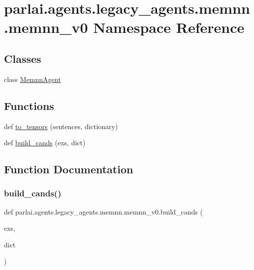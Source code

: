 \hypertarget{namespaceparlai_1_1agents_1_1legacy__agents_1_1memnn_1_1memnn__v0}{}\section{parlai.\+agents.\+legacy\+\_\+agents.\+memnn.\+memnn\+\_\+v0 Namespace Reference}
\label{namespaceparlai_1_1agents_1_1legacy__agents_1_1memnn_1_1memnn__v0}
\subsection*{Classes}
\begin{DoxyCompactItemize}
\item 
class \hyperlink{classparlai_1_1agents_1_1legacy__agents_1_1memnn_1_1memnn__v0_1_1MemnnAgent}{Memnn\+Agent}
\end{DoxyCompactItemize}
\subsection*{Functions}
\begin{DoxyCompactItemize}
\item 
def \hyperlink{namespaceparlai_1_1agents_1_1legacy__agents_1_1memnn_1_1memnn__v0_a8bf19c6993b40602c1d86a848b30c5a1}{to\+\_\+tensors} (sentences, dictionary)
\item 
def \hyperlink{namespaceparlai_1_1agents_1_1legacy__agents_1_1memnn_1_1memnn__v0_ab07fdb540c02e8e2a1cc7e8cf662a8b8}{build\+\_\+cands} (exs, dict)
\end{DoxyCompactItemize}


\subsection{Function Documentation}
\mbox{\label{namespaceparlai_1_1agents_1_1legacy__agents_1_1memnn_1_1memnn__v0_ab07fdb540c02e8e2a1cc7e8cf662a8b8}} 
\subsubsection{\texorpdfstring{build\+\_\+cands()}{build\_cands()}}
{\footnotesize\ttfamily def parlai.\+agents.\+legacy\+\_\+agents.\+memnn.\+memnn\+\_\+v0.\+build\+\_\+cands (\begin{DoxyParamCaption}\item[{}]{exs,  }\item[{}]{dict }\end{DoxyParamCaption})}


